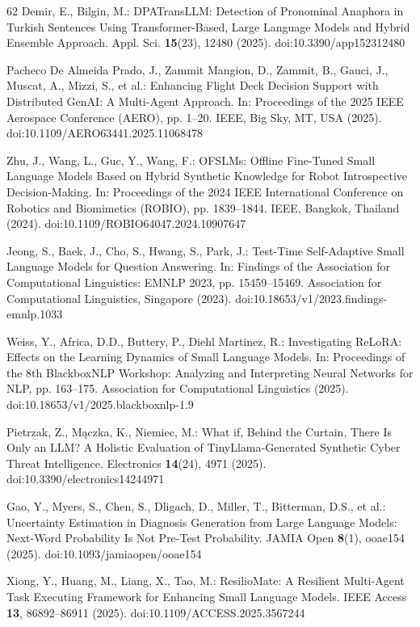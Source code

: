 \begin{thebibliography}{62}
Demir, E., Bilgin, M.: DPATransLLM: Detection of Pronominal Anaphora in Turkish Sentences Using Transformer-Based, Large Language Models and Hybrid Ensemble Approach. Appl. Sci. \textbf{15}(23), 12480 (2025). doi:10.3390/app152312480

Pacheco De Almeida Prado, J., Zammit Mangion, D., Zammit, B., Gauci, J., Muscat, A., Mizzi, S., et al.: Enhancing Flight Deck Decision Support with Distributed GenAI: A Multi-Agent Approach. In: Proceedings of the 2025 IEEE Aerospace Conference (AERO), pp. 1--20. IEEE, Big Sky, MT, USA (2025). doi:10.1109/AERO63441.2025.11068478

Zhu, J., Wang, L., Guc, Y., Wang, F.: OFSLMs: Offline Fine-Tuned Small Language Models Based on Hybrid Synthetic Knowledge for Robot Introspective Decision-Making. In: Proceedings of the 2024 IEEE International Conference on Robotics and Biomimetics (ROBIO), pp. 1839--1844. IEEE, Bangkok, Thailand (2024). doi:10.1109/ROBIO64047.2024.10907647

Jeong, S., Baek, J., Cho, S., Hwang, S., Park, J.: Test-Time Self-Adaptive Small Language Models for Question Answering. In: Findings of the Association for Computational Linguistics: EMNLP 2023, pp. 15459--15469. Association for Computational Linguistics, Singapore (2023). doi:10.18653/v1/2023.findings-emnlp.1033

Weiss, Y., Africa, D.D., Buttery, P., Diehl Martinez, R.: Investigating ReLoRA: Effects on the Learning Dynamics of Small Language Models. In: Proceedings of the 8th BlackboxNLP Workshop: Analyzing and Interpreting Neural Networks for NLP, pp. 163--175. Association for Computational Linguistics (2025). doi:10.18653/v1/2025.blackboxnlp-1.9

Pietrzak, Z., Mączka, K., Niemiec, M.: What if, Behind the Curtain, There Is Only an LLM? A Holistic Evaluation of TinyLlama-Generated Synthetic Cyber Threat Intelligence. Electronics \textbf{14}(24), 4971 (2025). doi:10.3390/electronics14244971

Gao, Y., Myers, S., Chen, S., Dligach, D., Miller, T., Bitterman, D.S., et al.: Uncertainty Estimation in Diagnosis Generation from Large Language Models: Next-Word Probability Is Not Pre-Test Probability. JAMIA Open \textbf{8}(1), ooae154 (2025). doi:10.1093/jamiaopen/ooae154

Xiong, Y., Huang, M., Liang, X., Tao, M.: ResilioMate: A Resilient Multi-Agent Task Executing Framework for Enhancing Small Language Models. IEEE Access \textbf{13}, 86892--86911 (2025). doi:10.1109/ACCESS.2025.3567244


\end{thebibliography}
